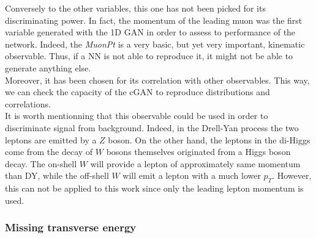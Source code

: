 Conversely to the other variables, this one has not been picked for its discriminating power. In fact, the momentum of the leading muon was the first variable generated with the 1D GAN in order to assess to performance of the network. Indeed, the \textit{MuonPt} is a very basic, but yet very important, kinematic observable. Thus, if a NN is not able to reproduce it, it might not be able to generate anything else. \\
Moreover, it has been chosen for its correlation with other observables. This way, we can check the capacity of the cGAN to reproduce distributions and correlations.\\

It is worth mentionning that this observable could be used in order to discriminate signal from background. Indeed, in the Drell-Yan process the two leptons are emitted by a $Z$ boson. On the other hand, the leptons in the di-Higgs come from the decay of $W$ bosons themselves originated from a Higgs boson decay. The on-shell $W$ will provide a lepton of approximately same momentum than DY, while the off-shell $W$ will emit a lepton with a much lower $p_T$. However, this can not be applied to this work since only the leading lepton momentum is used.


\subsubsection*{Missing transverse energy}

